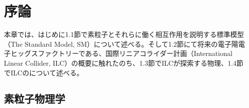 
\chapter{序論} \label{sec:Intruduction}
本章では、はじめに1.1節で素粒子とそれらに働く相互作用を説明する標準模型（The Standard Model, SM）について述べる。そして1.2節にて将来の電子陽電子ヒッグスファクトリーである、国際リニアコライダー計画（International Linear Collider, ILC）の概要に触れたのち、1.3節でILCが探索する物理、1.4節でILCのについて述べる。
\section{素粒子物理学}
